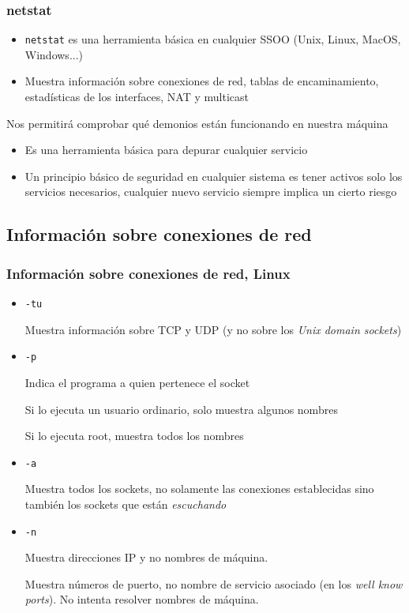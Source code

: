 \documentclass[ucs]{beamer}
\begin{document}
\begin{frame}[fragile]
\frametitle{netstat}




\begin{itemize}
\item
\verb|netstat| es una herramienta básica en cualquier SSOO (Unix, Linux, MacOS, Windows...)
\item
Muestra 
información sobre 
conexiones de red, tablas de encaminamiento, estadísticas de los interfaces,
NAT y multicast

\end{itemize}

Nos permitirá comprobar qué demonios están funcionando en nuestra
máquina

\begin{itemize}
\item
Es una herramienta básica para depurar cualquier servicio

\item
Un principio básico de seguridad en cualquier sistema es tener
activos solo los servicios necesarios, cualquier nuevo
servicio siempre implica un cierto riesgo
\end{itemize}
\end{frame}


\subsection{Información sobre conexiones de red}
\begin{frame}[fragile]
\frametitle{Información sobre conexiones de red, Linux}
\begin{itemize}
\item
\verb|-tu|

Muestra información sobre TCP y UDP (y no sobre los
\emph{Unix domain sockets})
\item
\verb|-p|

Indica el programa a quien pertenece el socket

Si lo ejecuta un usuario ordinario, solo muestra algunos nombres

Si lo ejecuta root, muestra todos los nombres
\item
\verb|-a|

Muestra todos los sockets, no solamente las conexiones establecidas
sino también los sockets que están \emph{escuchando}

\item
\verb|-n|

Muestra direcciones IP y no nombres de máquina.

Muestra números de puerto, no nombre de servicio asociado (en los \emph{well know ports}).
No intenta resolver nombres de máquina. 

\end{itemize}

\end{frame}
\end{document}
